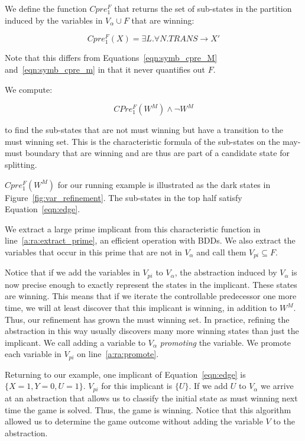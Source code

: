 We define the function $Cpre_1^F$ that returns the set of sub-states in the partition induced by the variables in $V_{\alpha} \cup F$ that are winning:

\begin{equation}
    Cpre_1^F(X) = \exists L. \forall N. TRANS \rightarrow X'
\end{equation}

Note that this differs from Equations~\ref{eqn:symb_cpre_M} and~\ref{eqn:symb_cpre_m} in that it never quantifies out $F$. 

We compute:

\begin{equation}
    CPre_1^F(W^M) \wedge \neg W^M
    \label{eqn:edge}
\end{equation}

\noindent to find the sub-states that are not must winning but have a transition to the must winning set. This is the characteristic formula of the sub-states on the may-must boundary that are winning and are thus are part of a candidate state for splitting.

$Cpre_1^F(W^M)$ for our running example is illustrated as the dark states in Figure~\ref{fig:var_refinement}. The sub-states in the top half satisfy Equation~\ref{eqn:edge}.

We extract a large prime implicant from this characteristic function in line~\ref{a:ra:extract_prime}, an efficient operation with BDDs. We also extract the variables that occur in this prime that are not in $V_\alpha$ and call them $V_{pi} \subseteq F$. 

Notice that if we add the variables in $V_{pi}$ to $V_\alpha$, the abstraction induced by $V_\alpha$ is now precise enough to exactly represent the states in the implicant. These states are winning. This means that if we iterate the controllable predecessor one more time, we will at least discover that this implicant is winning, in addition to $W^M$. Thus, our refinement has grown the must winning set. In practice, refining the abstraction in this way usually discovers many more winning states than just the implicant. We call adding a variable to $V_\alpha$ \emph{promoting} the variable. We promote each variable in $V_{pi}$ on line~\ref{a:ra:promote}.

Returning to our example, one implicant of Equation~\ref{eqn:edge} is $\{X=1, Y=0, U=1\}$. $V_{pi}$ for this implicant is $\{U\}$. If we add $U$ to $V_\alpha$ we arrive at an abstraction that allows us to classify the initial state as must winning next time the game is solved. Thus, the game is winning. Notice that this algorithm allowed us to determine the game outcome without adding the variable $V$ to the abstraction. 


